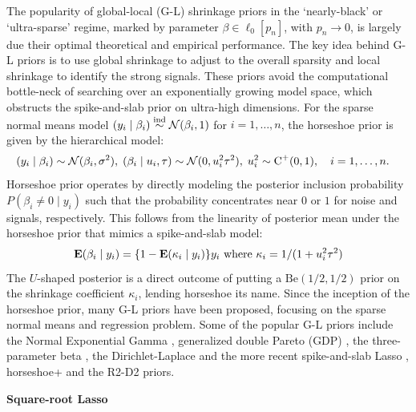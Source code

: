 \documentclass[chapters]{uamaththesis}
\begin{document}
The popularity of global-local (G-L) shrinkage priors in the `nearly-black' or `ultra-sparse' regime, marked by parameter $\beta \in \ell_0[p_n]$, with $p_n \to 0$, is largely due their optimal theoretical and empirical performance. The key idea behind G-L priors is to use global shrinkage to adjust to the overall sparsity and local shrinkage to identify the strong signals. These priors avoid the computational bottle-neck of searching over an exponentially growing model space, which obstructs the spike-and-slab prior \citep{mitchell88} on ultra-high dimensions. For the sparse normal means model $(y_i \mid \beta_i)  \stackrel{\mathrm{ind}}{\sim} \mathcal{N} (\beta_i,1)$ for $i = 1, \ldots, n$, the horseshoe prior \citep{carvalho2010horseshoe} is given by the hierarchical model: 
\begin{align*}
  (y_i \mid \beta_i) & \sim \mathcal{N}(\beta_i , \sigma^2), \;  (\beta_i \mid u_i, \tau) \sim 
  \mathcal{N}(0, u_i^2 \tau^2), \; u_i ^2 \sim \operatorname{C}^{+}(0,1), \quad i = 1, \ldots, n. 
\end{align*}
Horseshoe prior operates by directly modeling the posterior inclusion probability $P(\beta_i \ne 0 \mid y_i)$ such that the probability concentrates near $0$ or $1$ for noise and signals, respectively. This follows from the linearity of posterior mean under the horseshoe prior that mimics a spike-and-slab model:
\begin{equation}
{\bf E}(\beta_i \mid y_i) = \{1- {\bf E}(\kappa_i \mid y_i)\}y_i \text{ where } \kappa_i = 1/(1+u_i^2 \tau^2) \label{eq:kappa}
\end{equation}
The $U$-shaped posterior is a direct outcome of putting a $\text{Be}(1/2,1/2)$ prior on the shrinkage coefficient $\kappa_i$, lending horseshoe its name. Since the inception of the horseshoe prior, many G-L priors have been proposed, focusing on the sparse normal means and regression problem. Some of the popular G-L priors include the Normal Exponential Gamma \citep{griffin2005alternative}, generalized double Pareto (GDP) \citep{armagan2013generalized}, the three-parameter beta \citep{armagan2011generalized}, the Dirichlet-Laplace \citep{bhattacharya2014dirichlet} and the more recent spike-and-slab Lasso \citep{rovckova2016spike}, horseshoe+ \citep{bhadra2015horseshoe+} and the R2-D2 \citep{zhang2016high} priors. 



\noindent \textbf{Square-root Lasso} 
\end{document}

